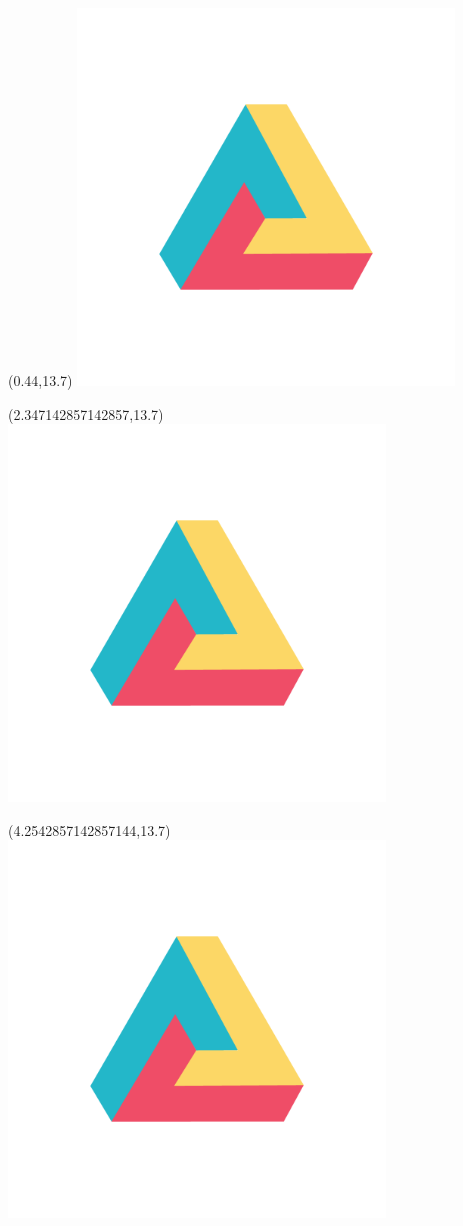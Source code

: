 \documentclass[22pt]{beamer}
\begin{document}
\begin{frame}[fragile]
\begin{textblock}{2}(0.44,13.7)
\includegraphics[height=10cm]{dh.png}
\end{textblock}
\begin{textblock}{2}(2.347142857142857,13.7)
\includegraphics[height=10cm]{dh.png}
\end{textblock}
\begin{textblock}{2}(4.2542857142857144,13.7)
\includegraphics[height=10cm]{dh.png}

\end{textblock}
\end{frame}
\end{document}
